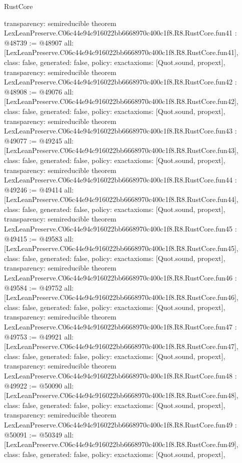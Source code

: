 \begin{lexlean}{RustCore}
\begin{coremodule}
{  transparency: semireducible
}
theorem LexLeanPreserve.C06c44e94c916022bb6668970c400c1f8.R8.RustCore.fun41 : @48739 := @48907 {
  all: [LexLeanPreserve.C06c44e94c916022bb6668970c400c1f8.R8.RustCore.fun41],
  class: false,
  generated: false,
  policy: exact{axioms: [Quot.sound, propext]},
  transparency: semireducible
}
theorem LexLeanPreserve.C06c44e94c916022bb6668970c400c1f8.R8.RustCore.fun42 : @48908 := @49076 {
  all: [LexLeanPreserve.C06c44e94c916022bb6668970c400c1f8.R8.RustCore.fun42],
  class: false,
  generated: false,
  policy: exact{axioms: [Quot.sound, propext]},
  transparency: semireducible
}
theorem LexLeanPreserve.C06c44e94c916022bb6668970c400c1f8.R8.RustCore.fun43 : @49077 := @49245 {
  all: [LexLeanPreserve.C06c44e94c916022bb6668970c400c1f8.R8.RustCore.fun43],
  class: false,
  generated: false,
  policy: exact{axioms: [Quot.sound, propext]},
  transparency: semireducible
}
theorem LexLeanPreserve.C06c44e94c916022bb6668970c400c1f8.R8.RustCore.fun44 : @49246 := @49414 {
  all: [LexLeanPreserve.C06c44e94c916022bb6668970c400c1f8.R8.RustCore.fun44],
  class: false,
  generated: false,
  policy: exact{axioms: [Quot.sound, propext]},
  transparency: semireducible
}
theorem LexLeanPreserve.C06c44e94c916022bb6668970c400c1f8.R8.RustCore.fun45 : @49415 := @49583 {
  all: [LexLeanPreserve.C06c44e94c916022bb6668970c400c1f8.R8.RustCore.fun45],
  class: false,
  generated: false,
  policy: exact{axioms: [Quot.sound, propext]},
  transparency: semireducible
}
theorem LexLeanPreserve.C06c44e94c916022bb6668970c400c1f8.R8.RustCore.fun46 : @49584 := @49752 {
  all: [LexLeanPreserve.C06c44e94c916022bb6668970c400c1f8.R8.RustCore.fun46],
  class: false,
  generated: false,
  policy: exact{axioms: [Quot.sound, propext]},
  transparency: semireducible
}
theorem LexLeanPreserve.C06c44e94c916022bb6668970c400c1f8.R8.RustCore.fun47 : @49753 := @49921 {
  all: [LexLeanPreserve.C06c44e94c916022bb6668970c400c1f8.R8.RustCore.fun47],
  class: false,
  generated: false,
  policy: exact{axioms: [Quot.sound, propext]},
  transparency: semireducible
}
theorem LexLeanPreserve.C06c44e94c916022bb6668970c400c1f8.R8.RustCore.fun48 : @49922 := @50090 {
  all: [LexLeanPreserve.C06c44e94c916022bb6668970c400c1f8.R8.RustCore.fun48],
  class: false,
  generated: false,
  policy: exact{axioms: [Quot.sound, propext]},
  transparency: semireducible
}
theorem LexLeanPreserve.C06c44e94c916022bb6668970c400c1f8.R8.RustCore.fun49 : @50091 := @50349 {
  all: [LexLeanPreserve.C06c44e94c916022bb6668970c400c1f8.R8.RustCore.fun49],
  class: false,
  generated: false,
  policy: exact{axioms: [Quot.sound, propext]},
}
\end{coremodule}
\end{lexlean}
